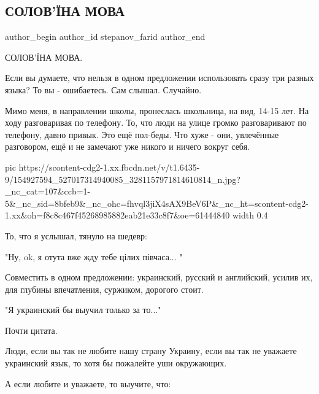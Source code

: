  
 
 
 
 
 
\subsection{СОЛОВ'ЇНА МОВА}
\label{sec:28_02_2021.fb.stepanov_farid.1.solovjina_mova}
 
\ifcmt
 author_begin
   author_id stepanov_farid
 author_end
\fi

СОЛОВ'ЇНА МОВА.

Если вы думаете, что нельзя в одном предложении использовать сразу три разных
языка? То вы - ошибаетесь. Сам слышал. Случайно. 

Мимо меня, в направлении школы, пронеслась школьница, на вид, 14-15 лет. На
ходу разговаривая по телефону. То, что люди на улице  громко разговаривают по
телефону, давно привык. Это ещё пол-беды. Что хуже - они, увлечённые
разговором, ещё и не замечают уже никого и ничего вокруг себя. 

\ifcmt
  pic https://scontent-cdg2-1.xx.fbcdn.net/v/t1.6435-9/154927594_527017314940085_3281157971814610814_n.jpg?_nc_cat=107&ccb=1-5&_nc_sid=8bfeb9&_nc_ohc=fhvql3jiX4sAX9BeV6P&_nc_ht=scontent-cdg2-1.xx&oh=f8c8c467f45268985882eab21e33c8f7&oe=61444840
  width 0.4
\fi

То, что я услышал, тянуло на шедевр:

"Ну, ok, я отута вже жду тебе цілих півчаса... "

Совместить в одном предложении: украинский, русский и английский, усилив их,
для глубины впечатления, суржиком, дорогого стоит. 

"Я украинский бы выучил только за то..."

Почти цитата.

Люди, если вы так не любите нашу страну Украину, если вы так не уважаете
украинский язык, то хотя бы пожалейте уши окружающих. 

А если любите и уважаете, то выучите, что:

